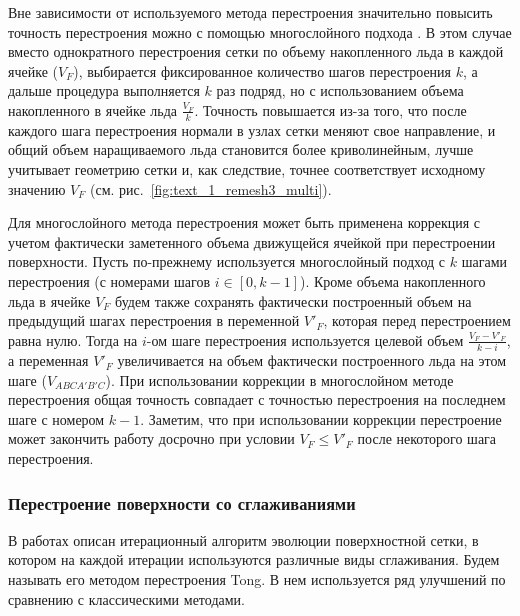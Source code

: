 Вне зависимости от используемого метода перестроения значительно повысить точность перестроения можно с помощью многослойного подхода \cite{BourgaultCote2017}.
В этом случае вместо однократного перестроения сетки по объему накопленного льда в каждой ячейке ($V_F$), выбирается фиксированное количество шагов перестроения $k$, а дальше процедура выполняется $k$ раз подряд, но с использованием объема накопленного в ячейке льда $\frac{V_F}{k}$.
Точность повышается из-за того, что после каждого шага перестроения нормали в узлах сетки меняют свое направление, и общий объем наращиваемого льда становится более криволинейным, лучше учитывает геометрию сетки и, как следствие, точнее соответствует исходному значению $V_F$ (см. рис.~\ref{fig:text_1_remesh3_multi}).

Для многослойного метода перестроения может быть применена коррекция с учетом фактически заметенного объема движущейся ячейкой при перестроении поверхности.
Пусть по-прежнему используется многослойный подход с $k$ шагами перестроения (с номерами шагов $i \in [0, k - 1]$).
Кроме объема накопленного льда в ячейке $V_F$ будем также сохранять фактически построенный объем на предыдущий шагах перестроения в переменной $V'_F$, которая перед перестроением равна нулю.
Тогда на $i$-ом шаге перестроения используется целевой объем $\frac{V_F - V'_F}{k - i}$, а переменная $V'_F$ увеличивается на объем фактически построенного льда на этом шаге ($V_{ABCA'B'C}$).
При использовании коррекции в многослойном методе перестроения общая точность совпадает с точностью перестроения на последнем шаге с номером $k - 1$.
Заметим, что при использовании коррекции перестроение может закончить работу досрочно при условии $V_F \le V'_F$ после некоторого шага перестроения.

\subsubsection{Перестроение поверхности со сглаживаниями}\label{sec:tong_method}

В работах \cite{Thompson2013Remesh,Tong2017Remesh} описан итерационный алгоритм эволюции поверхностной сетки, в котором на каждой итерации используются различные виды сглаживания.
Будем называть его методом перестроения Tong.
В нем используется ряд улучшений по сравнению с классическими методами.

